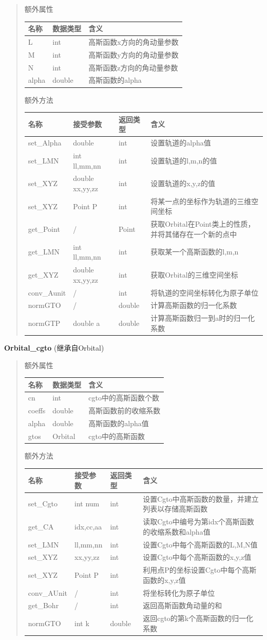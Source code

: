 \documentclass[11pt]{article}
\begin{document}
\begin{quote}
额外属性

\begin{longtable}[]{@{}lll@{}}
\toprule
名称 & 数据类型 & 含义\tabularnewline
\midrule
\endhead
L & int & 高斯函数x方向的角动量参数\tabularnewline
M & int & 高斯函数y方向的角动量参数\tabularnewline
N & int & 高斯函数z方向的角动量参数\tabularnewline
alpha & double & 高斯函数的alpha\tabularnewline
\bottomrule
\end{longtable}

额外方法

\begin{longtable}[]{@{}llll@{}}
\toprule
名称 & 接受参数 & 返回类型 & 含义\tabularnewline
\midrule
\endhead
set\_Alpha & double & int & 设置轨道的alpha值\tabularnewline
set\_LMN & int ll,mm,nn & int & 设置轨道的l,m,n的值\tabularnewline
set\_XYZ & double xx,yy,zz & int & 设置轨道的x,y,z的值\tabularnewline
set\_XYZ & Point P & int &
将某一点的坐标作为轨道的三维空间坐标\tabularnewline
get\_Point & / & Point &
获取Orbital在Point类上的性质，并将其储存在一个新的点中\tabularnewline
get\_LMN & int ll,mm,nn & int & 获取某一个高斯函数的l,m,n\tabularnewline
get\_XYZ & double xx,yy,zz & int &
获取Orbital的三维空间坐标\tabularnewline
conv\_Aunit & / & int & 将轨道的空间坐标转化为原子单位\tabularnewline
normGTO & / & double & 计算高斯函数的归一化系数\tabularnewline
normGTP & double a & double &
计算高斯函数归一到a时的归一化系数\tabularnewline
\bottomrule
\end{longtable}
\end{quote}

\textbf{Orbital\_cgto} (继承自Orbital)

\begin{quote}
额外属性

\begin{longtable}[]{@{}lll@{}}
\toprule
名称 & 数据类型 & 含义\tabularnewline
\midrule
\endhead
cn & int & cgto中的高斯函数个数\tabularnewline
coeffs & double & 高斯函数前的收缩系数\tabularnewline
alpha & double & 高斯函数的alpha值\tabularnewline
gtos & Orbital & cgto中的高斯函数\tabularnewline
\bottomrule
\end{longtable}

额外方法

\begin{longtable}[]{@{}llll@{}}
\toprule
名称 & 接受参数 & 返回类型 & 含义\tabularnewline
\midrule
\endhead
set\_Cgto & int num & int &
设置Cgto中高斯函数的数量，并建立列表以存储高斯函数\tabularnewline
get\_CA & idx,cc,aa & int &
读取Cgto中编号为第idx个高斯函数的收缩系数和alpha值\tabularnewline
set\_LMN & ll,mm,nn & int &
设置Cgto中每个高斯函数的L,M,N值\tabularnewline
set\_XYZ & xx,yy,zz & int &
设置Cgto中每个高斯函数的x,y,z值\tabularnewline
set\_XYZ & Point P & int &
利用点P的坐标设置Cgto中每个高斯函数的x,y,z值\tabularnewline
conv\_AUnit & / & int & 将坐标转化为原子单位\tabularnewline
get\_Bohr & / & int & 返回高斯函数角动量的和\tabularnewline
normGTO & int k & double &
返回cgto的第k个高斯函数的归一化系数\tabularnewline
\bottomrule
\end{longtable}
\end{quote}
\end{document}
